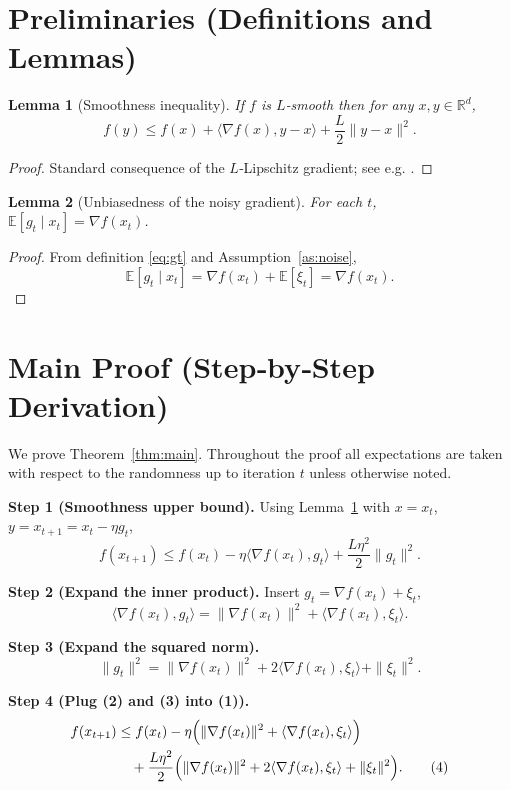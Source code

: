 \documentclass[11pt]{article}
\newtheorem{lemma}{Lemma}
\newcommand{\E}{\mathbb{E}}
\newcommand{\R}{\mathbb{R}}
\begin{document}
\newpage

\section*{Preliminaries (Definitions and Lemmas)}
\begin{lemma}[Smoothness inequality]\label{lem:smooth}
If $f$ is $L$‑smooth then for any $x,y\in\R^{d}$,
\[
f(y)\le f(x)+\langle \nabla f(x),y-x\rangle+\frac{L}{2}\|y-x\|^{2}.
\]
\end{lemma}
\begin{proof}
Standard consequence of the $L$‑Lipschitz gradient; see e.g. \cite{Nesterov2004}.
\end{proof}

\begin{lemma}[Unbiasedness of the noisy gradient]\label{lem:unbiased}
For each $t$, $\E[g_t\mid x_t]=\nabla f(x_t)$.
\end{lemma}
\begin{proof}
From definition \eqref{eq:gt} and Assumption~\ref{as:noise},
\[
\E[g_t\mid x_t]=\nabla f(x_t)+\E[\xi_t]=\nabla f(x_t).
\]
\end{proof}

\section*{Main Proof (Step‑by‑Step Derivation)}
We prove Theorem~\ref{thm:main}. Throughout the proof all expectations are taken with respect to the randomness up to iteration $t$ unless otherwise noted.

\noindent\textbf{Step 1 (Smoothness upper bound).}  
Using Lemma~\ref{lem:smooth} with $x=x_t$, $y=x_{t+1}=x_t-\eta g_t$,
\[
f(x_{t+1})\le f(x_t)-\eta\langle \nabla f(x_t),g_t\rangle
+\frac{L\eta^{2}}{2}\|g_t\|^{2}.                                 \tag{1}
\]

\noindent\textbf{Step 2 (Expand the inner product).}  
Insert $g_t=\nabla f(x_t)+\xi_t$,
\[
\langle \nabla f(x_t),g_t\rangle
= \|\nabla f(x_t)\|^{2}+\langle \nabla f(x_t),\xi_t\rangle .      \tag{2}
\]

\noindent\textbf{Step 3 (Expand the squared norm).}  
\[
\|g_t\|^{2}
= \|\nabla f(x_t)\|^{2}+2\langle \nabla f(x_t),\xi_t\rangle+\|\xi_t\|^{2}. \tag{3}
\]

\noindent\textbf{Step 4 (Plug (2) and (3) into (1)).}  
\begin{align}
f(x_{t+1})
&\le f(x_t)-\eta\Bigl(\|\nabla f(x_t)\|^{2}+\langle \nabla f(x_t),\xi_t\rangle\Bigr)  \nonumber\\
&\quad +\frac{L\eta^{2}}{2}\Bigl(\|\nabla f(x_t)\|^{2}+2\langle \nabla f(x_t),\xi_t\rangle+\|\xi_t\|^{2}\Bigr). \tag{4}
\end{align}
\end{document}
